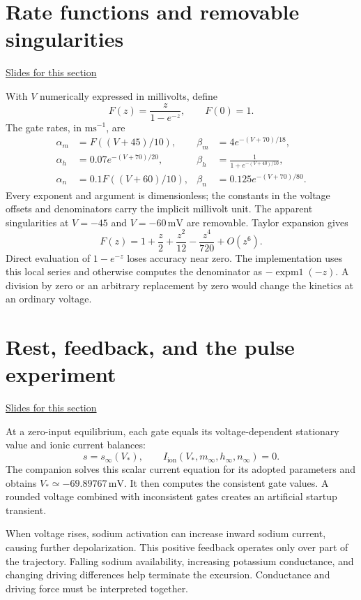 \documentclass[11pt,letterpaper]{article}
\theoremstyle{definition}\newtheorem{definition}{Definition}\newtheorem{example}{Example}
\numberwithin{equation}{section}
\begin{document}
\section{Rate functions and removable singularities}
\hypertarget{note-rate-functions-and-removable-singularities}{}\label{note:rate-functions-and-removable-singularities}
{\small \href{slides.html\#frame=activation-rate-functions\&step=1}{Slides for this section}}\par
With $V$ numerically expressed in millivolts, define
\[
F(z)=\frac z{1-e^{-z}},\qquad F(0)=1.
\]
The gate rates, in $\mathrm{ms}^{-1}$, are
\[
\begin{aligned}
\alpha_m&=F((V+45)/10),&\beta_m&=4e^{-(V+70)/18},\\
\alpha_h&=0.07e^{-(V+70)/20},&\beta_h&=\frac1{1+e^{-(V+40)/10}},\\
\alpha_n&=0.1F((V+60)/10),&\beta_n&=0.125e^{-(V+70)/80}.
\end{aligned}
\]
Every exponent and argument is dimensionless; the constants in the voltage offsets and denominators carry the implicit millivolt unit. The apparent singularities at $V=-45$ and $V=-60\,\mathrm{mV}$ are removable. Taylor expansion gives
\[
F(z)=1+\frac z2+\frac{z^2}{12}-\frac{z^4}{720}+O(z^6).
\]
Direct evaluation of $1-e^{-z}$ loses accuracy near zero. The implementation uses this local series and otherwise computes the denominator as $-\operatorname{expm1}(-z)$. A division by zero or an arbitrary replacement by zero would change the kinetics at an ordinary voltage.
\section{Rest, feedback, and the pulse experiment}
\hypertarget{note-rest-feedback-and-the-pulse-experiment}{}\label{note:rest-feedback-and-the-pulse-experiment}
{\small \href{slides.html\#frame=a-self-consistent-resting-state\&step=1}{Slides for this section}}\par
At a zero-input equilibrium, each gate equals its voltage-dependent stationary value and ionic current balances:
\[
s=s_\infty(V_*),\qquad I_{\mathrm{ion}}(V_*,m_\infty,h_\infty,n_\infty)=0.
\]
The companion solves this scalar current equation for its adopted parameters and obtains $V_*\simeq-69.89767\,\mathrm{mV}$. It then computes the consistent gate values. A rounded voltage combined with inconsistent gates creates an artificial startup transient.

When voltage rises, sodium activation can increase inward sodium current, causing further depolarization. This positive feedback operates only over part of the trajectory. Falling sodium availability, increasing potassium conductance, and changing driving differences help terminate the excursion. Conductance and driving force must be interpreted together.
\end{document}
